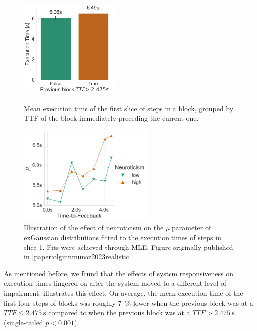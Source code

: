 \begin{figure}
    \begin{minipage}[t]{.45\textwidth}
        \centering
        \includegraphics[height=13em]{Figs/2021Impact/previousblock_vs_exectime}
        \caption{Mean execution time of the first slice of steps in a block, grouped by \acs{TTF} of the block immediately preceding the current one.}\label{fig:prevblockvsexectime}
    \end{minipage}%
    \hfill%
    \begin{minipage}[t]{.45\textwidth}
        \centering
        \includegraphics[height=13em]{publications/2023EdgeDroid2/figs/new_model/mu_fits_exgaussian_slice0}
        \caption{%
            Illustration of the effect of neuroticism on the \ensuremath{\mu} parameter of \acs{exGaussian} distributions fitted to the execution times of steps in slice \num{1}.
            Fits were achieved through \gls{MLE}.
            Figure originally published in \cref{paper:olguinmunoz2023realistic}
        }\label{fig:ttfvsexgaussianmu}
    \end{minipage}
\end{figure}

As mentioned before, we found that the effects of system responsiveness on execution times lingered on after the system moved to a different level of impairment.
 illustrates this effect.
On average, the mean execution time of the first four steps of blocks was roughly \SI{7}{\percent} lower when the previous block was at a \ensuremath{TTF \leq \SI{2.475}{\second}} compared to when the previous block was at a \ensuremath{TTF > \SI{2.475}{\second}} (single-tailed \ensuremath{p < 0.001}).

